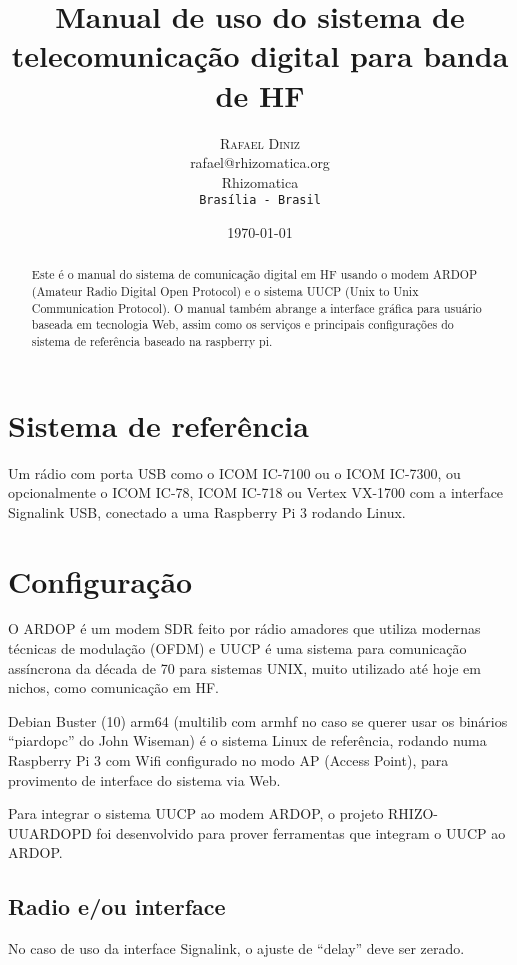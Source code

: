 \documentclass[11pt,a4paper]{article}
\title{Manual de uso do sistema de telecomunicação digital para banda de HF}
\author{
       \large
        \textsc{Rafael Diniz}
        \mbox{}\\ %
        rafael@rhizomatica.org\\
        \mbox{Rhizomatica} \\ %
        \normalsize
        \texttt{Brasília - Brasil}\\
}
\date{\today}
\begin{document}
\maketitle

\begin{abstract}
Este é o manual do sistema de comunicação digital em HF usando o modem ARDOP
(Amateur Radio Digital Open Protocol) e o sistema UUCP (Unix to Unix
Communication Protocol). O manual também abrange a interface gráfica
para usuário baseada em tecnologia Web, assim como os serviços e principais
configurações do sistema de referência baseado na raspberry pi.

\end{abstract}

\newpage

\tableofcontents

\section{Sistema de referência}

Um rádio com porta USB como o ICOM IC-7100 ou o ICOM IC-7300, ou opcionalmente o ICOM IC-78, ICOM IC-718 ou Vertex
VX-1700 com a interface Signalink USB, conectado a uma Raspberry Pi 3
rodando Linux.

\section{Configuração}

O ARDOP é um modem SDR feito por rádio amadores que utiliza modernas
técnicas de modulação (OFDM) e UUCP é uma sistema para comunicação
assíncrona da década de 70 para sistemas UNIX, muito utilizado até
hoje em nichos, como comunicação em HF.

Debian Buster (10) arm64 (multilib com armhf no caso se querer usar os
binários ``piardopc'' do John Wiseman) é o sistema Linux de referência,
rodando numa Raspberry Pi 3 com Wifi configurado no modo AP (Access Point),
para provimento de interface do sistema via Web.

Para integrar o sistema UUCP ao modem ARDOP, o projeto RHIZO-UUARDOPD
foi desenvolvido para prover ferramentas que integram o UUCP ao ARDOP.

\subsection{Radio e/ou interface}

No caso de uso da interface Signalink, o ajuste de ``delay'' deve ser
zerado.
\end{document}
